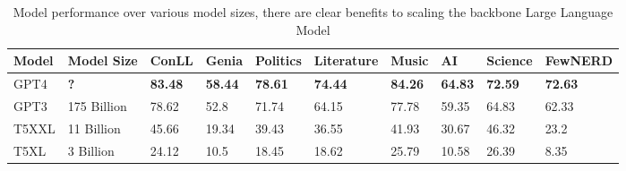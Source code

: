 \documentclass[11pt]{article}
\begin{document}
\begin{table*}[ht]
\begin{tabular}{|l|l|l|l|l|l|l|l|l|l|}
\hline
Model & Model Size  & ConLL                              & Genia                              & Politics                           & Literature                         & Music                              & AI                                 & Science                            & FewNERD                            \\\hline
GPT4  & \textbf{?}  & \textbf{83.48} & \textbf{58.44} & \textbf{78.61} & \textbf{74.44} & \textbf{84.26} & \textbf{64.83} & \textbf{72.59} & \textbf{72.63} \\
GPT3  & 175 Billion & 78.62                              & 52.8                               & 71.74                              & 64.15                              & 77.78                              & 59.35                              & 64.83                              & 62.33                              \\
T5XXL & 11 Billion  & 45.66                              & 19.34                              & 39.43                              & 36.55                              & 41.93                              & 30.67                              & 46.32                              & 23.2                               \\
T5XL  & 3 Billion   & 24.12                          & 10.5                               & 18.45                              & 18.62                              & 25.79                 & 10.58                              & 26.39                              & 8.35                                \\\hline
\end{tabular}
\caption{Model performance over various model sizes, there are clear benefits to scaling the backbone Large Language Model}
\label{table:size}
\end{table*} 
\end{document}
